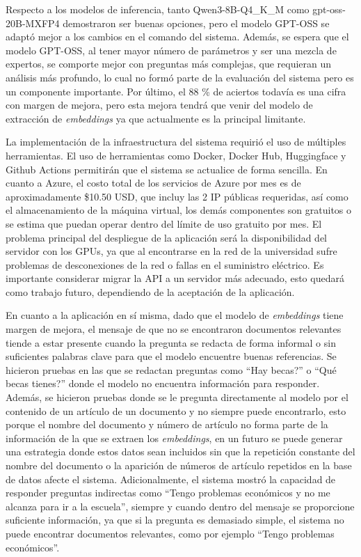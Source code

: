 Respecto a los modelos de inferencia, tanto Qwen3-8B-Q4\_K\_M como
gpt-oss-20B-MXFP4 demostraron ser buenas opciones, pero el modelo
GPT-OSS se adaptó mejor a los cambios en el comando del sistema. Además,
se espera que el modelo GPT-OSS, al tener mayor número de parámetros y ser una mezcla
de expertos, se comporte mejor con preguntas más complejas, que
requieran un análisis más profundo, lo cual no formó parte de la
evaluación del sistema pero es un componente importante. Por último,
el 88 \% de aciertos todavía es una cifra con margen de mejora, pero
esta mejora tendrá que venir del modelo de extracción de \textit{embeddings}
ya que actualmente es la principal limitante.

La implementación de la infraestructura del sistema requirió el
uso de múltiples herramientas. El uso de herramientas como Docker,
Docker Hub, Huggingface y Github Actions permitirán que el sistema
se actualice de forma sencilla. En cuanto a Azure, el costo total
de los servicios de Azure por mes es de aproximadamente \$10.50 USD,
que incluy las 2 IP públicas requeridas, así como el almacenamiento
de la máquina virtual, los demás componentes son gratuitos
o se estima que puedan operar dentro del límite de uso gratuito
por mes. El problema principal del despliegue de la aplicación será la
disponibilidad del servidor con los GPUs, ya que al encontrarse en la
red de la universidad sufre problemas de desconexiones de la red o
fallas en el suministro eléctrico. Es importante considerar migrar
la API a un servidor más adecuado, esto quedará como trabajo
futuro, dependiendo de la aceptación de la aplicación.

En cuanto a la aplicación en sí misma, dado que el modelo de
\textit{embeddings} tiene margen de mejora, el mensaje de que no se
encontraron documentos relevantes tiende a estar presente cuando
la pregunta se redacta de forma informal o sin suficientes palabras
clave para que el modelo encuentre buenas referencias. Se hicieron
pruebas en las que se redactan preguntas como ``Hay becas?'' o
``Qué becas tienes?'' donde el modelo no encuentra información para
responder. Además, se hicieron pruebas donde se le pregunta directamente
al modelo por el contenido de un artículo de un documento y no siempre
puede encontrarlo, esto porque el nombre del documento y número de
artículo no forma parte de la información de la que se extraen los
\textit{embeddings}, en un futuro se puede generar una estrategia
donde estos datos sean incluidos sin que la repetición constante
del nombre del documento o la aparición de números de artículo
repetidos en la base de datos afecte el sistema. Adicionalmente,
el sistema mostró la capacidad de responder preguntas indirectas como
``Tengo problemas económicos y no me alcanza para ir a la escuela'',
siempre y cuando dentro del mensaje se proporcione suficiente información,
ya que si la pregunta es demasiado simple, el sistema no puede encontrar
documentos relevantes, como por ejemplo ``Tengo problemas económicos''.

